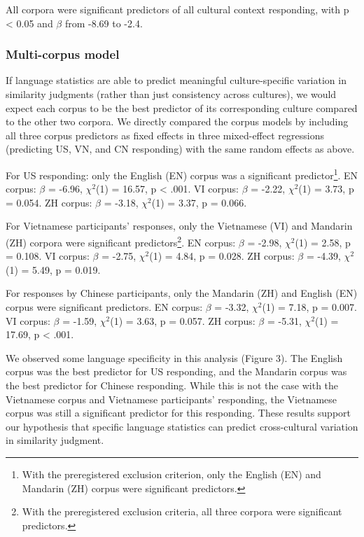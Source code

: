 \documentclass[10pt, letterpaper]{article}
\begin{document}
All corpora were significant predictors of all cultural context
responding, with p \textless{} 0.05 and \(\beta\) from -8.69 to -2.4.

\hypertarget{multi-corpus-model}{%
\subsubsection{Multi-corpus model}\label{multi-corpus-model}}

If language statistics are able to predict meaningful culture-specific
variation in similarity judgments (rather than just consistency across
cultures), we would expect each corpus to be the best predictor of its
corresponding culture compared to the other two corpora. We directly
compared the corpus models by including all three corpus predictors as
fixed effects in three mixed-effect regressions (predicting US, VN, and
CN responding) with the same random effects as above.

For US responding: only the English (EN) corpus was a significant
predictor\footnote{With the preregistered exclusion criterion, only the
  English (EN) and Mandarin (ZH) corpus were significant predictors.}.
EN corpus: \(\beta\) = -6.96, \(\chi^2\)(1) = 16.57, p \textless{} .001.
VI corpus: \(\beta\) = -2.22, \(\chi^2\)(1) = 3.73, p = 0.054. ZH
corpus: \(\beta\) = -3.18, \(\chi^2\)(1) = 3.37, p = 0.066.

For Vietnamese participants' responses, only the Vietnamese (VI) and
Mandarin (ZH) corpora were significant predictors\footnote{With the
  preregistered exclusion criteria, all three corpora were significant
  predictors.}. EN corpus: \(\beta\) = -2.98, \(\chi^2\)(1) = 2.58, p =
0.108. VI corpus: \(\beta\) = -2.75, \(\chi^2\)(1) = 4.84, p = 0.028. ZH
corpus: \(\beta\) = -4.39, \(\chi^2\)(1) = 5.49, p = 0.019.

For responses by Chinese participants, only the Mandarin (ZH) and
English (EN) corpus were significant predictors. EN corpus: \(\beta\) =
-3.32, \(\chi^2\)(1) = 7.18, p = 0.007. VI corpus: \(\beta\) = -1.59,
\(\chi^2\)(1) = 3.63, p = 0.057. ZH corpus: \(\beta\) = -5.31,
\(\chi^2\)(1) = 17.69, p \textless{} .001.

We observed some language specificity in this analysis (Figure 3). The
English corpus was the best predictor for US responding, and the
Mandarin corpus was the best predictor for Chinese responding. While
this is not the case with the Vietnamese corpus and Vietnamese
participants' responding, the Vietnamese corpus was still a significant
predictor for this responding. These results support our hypothesis that
specific language statistics can predict cross-cultural variation in
similarity judgment.
\end{document}
